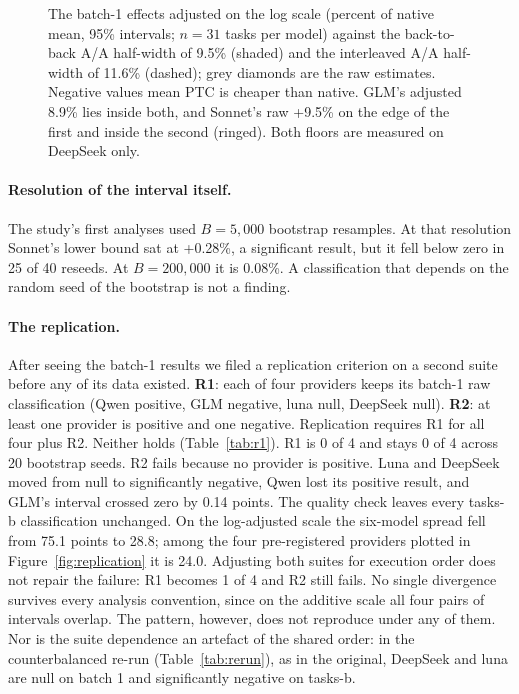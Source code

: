 \documentclass[10pt]{article}
\newcommand*{\mi}{\textminus}   %
\begin{document}
\begin{figure}[htbp]\centering
\caption{The batch-1 effects adjusted on the log scale (percent of native mean, 95\% intervals;
$n = 31$ tasks per model) against the back-to-back A/A
half-width of 9.5\% (shaded) and the interleaved A/A half-width of 11.6\% (dashed); grey diamonds are
the raw estimates. Negative values mean PTC is cheaper than native. GLM's adjusted \mi{}8.9\% lies inside both, and Sonnet's raw +9.5\% on the edge of
the first and inside the second (ringed). Both floors are measured on DeepSeek only.}\label{fig:floor}\end{figure}

\paragraph{Resolution of the interval itself.} The study's first analyses used $B = 5{,}000$
bootstrap resamples. At that resolution Sonnet's lower bound sat at +0.28\%, a significant result, but
it fell below zero in 25 of 40 reseeds. At $B = 200{,}000$ it is \mi{}0.08\%. A classification that
depends on the random seed of the bootstrap is not a finding.

\paragraph{The replication.} After seeing the batch-1 results we filed a replication criterion on a
second suite before any of its data existed. \textbf{R1}: each of four providers keeps its batch-1 raw
classification (Qwen positive, GLM negative, luna null, DeepSeek null). \textbf{R2}: at least one
provider is positive and one negative. Replication requires R1 for all four plus R2. Neither holds
(Table~\ref{tab:r1}). R1 is 0 of 4 and stays 0 of 4 across 20 bootstrap seeds. R2 fails because no
provider is positive. Luna and DeepSeek moved from null to significantly negative, Qwen lost its
positive result, and GLM's interval crossed zero by 0.14 points. The quality check leaves every
tasks-b classification unchanged. On the log-adjusted scale the six-model spread fell from 75.1
points to 28.8; among the four pre-registered providers plotted in Figure~\ref{fig:replication} it is 24.0. Adjusting both suites for execution order does not
repair the failure: R1 becomes 1 of 4 and R2 still fails. No single divergence survives every analysis
convention, since on the additive scale all four pairs of intervals overlap. The pattern, however,
does not reproduce under any of them. Nor is the suite dependence an artefact of the shared order: in
the counterbalanced re-run (Table~\ref{tab:rerun}), as in the original, DeepSeek and luna are null on
batch 1 and significantly negative on tasks-b.
\end{document}
